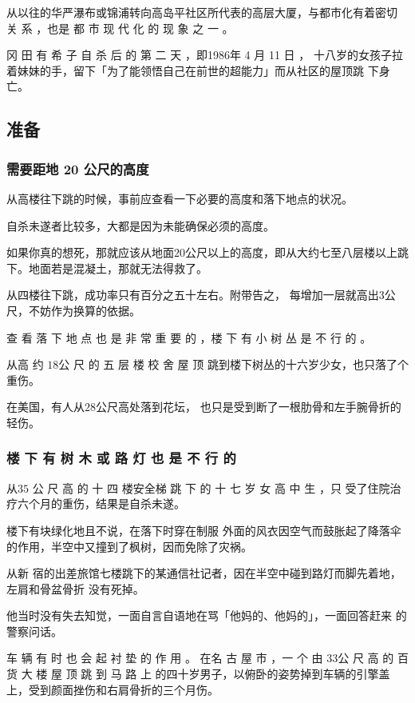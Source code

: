 \documentclass[UTF8]{ctexart}
\begin{document}
从以往的华严瀑布或锦浦转向高岛平社区所代表的高层大厦，与都市化有着密切 关 系 ，也是 都 市 现 代 化 的 现 象 之 一 。

冈 田 有 希 子 自 杀 后 的 第 二 天 ，即1986年 4 月 11 日 ， 十八岁的女孩子拉着妹妹的手，留下「为了能领悟自己在前世的超能力」而从社区的屋顶跳 下身亡。 

\subsection{准备}

\subsubsection*{需要距地 20 公尺的高度}

从高楼往下跳的时候，事前应查看一下必要的高度和落下地点的状况。

自杀未遂者比较多，大都是因为未能确保必须的高度。

如果你真的想死，那就应该从地面$20$公尺以上的高度，即从大约七至八层楼以上跳下。地面若是混凝土，那就无法得救了。

从四楼往下跳，成功率只有百分之五十左右。附带告之， 每增加一层就高出$3$公尺，不妨作为换算的依据。

查 看 落 下 地 点 也 是 非 常 重 要 的 ，楼 下 有 小 树 丛 是 不 行 的 。

从高 约 $18$公 尺 的 五 层 楼 校 舍 屋 顶 跳到楼下树丛的十六岁少女，也只落了个重伤。

在美国，有人从$28$公尺高处落到花坛， 也只是受到断了一根肋骨和左手腕骨折的轻伤。

\subsubsection*{楼 下 有 树 木 或 路 灯 也 是 不 行 的}

从$35$ 公 尺 高 的 十 四 楼安全梯 跳 下 的 十 七 岁 女 高 中 生 ，只 受了住院治疗六个月的重伤，结果是自杀未遂。

楼下有块绿化地且不说，在落下时穿在制服 外面的风衣因空气而鼓胀起了降落伞的作用，半空中又撞到了枫树，因而免除了灾祸。

从新 宿的出差旅馆七楼跳下的某通信社记者，因在半空中碰到路灯而脚先着地，左肩和骨盆骨折 没有死掉。

他当时没有失去知觉，一面自言自语地在骂「他妈的、他妈的」，一面回答赶来 的警察问话。

车 辆 有 时 也 会 起 衬 垫 的 作 用 。
在名 古 屋 市 ，一 个 由 $33$公 尺 高 的 百 货 大 楼 屋 顶 跳 到 马 路 上 的四十岁男子，以俯卧的姿势掉到车辆的引擎盖上，受到颜面挫伤和右肩骨折的三个月伤。
\end{document}
